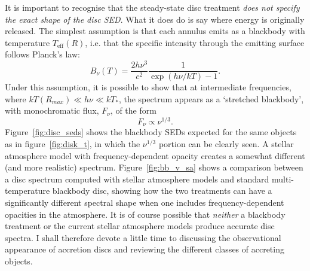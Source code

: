 It is important to recognise that the steady-state disc treatment
{\sl does not specify the exact shape of the disc SED}. What it does do is 
say where energy is originally released. The simplest assumption is
that each annulus emits as a blackbody with temperature 
$T_{\mathrm{eff}} (R)$, i.e. that the specific intensity through the emitting surface
follows Planck's law:
\begin{equation}
B_\nu (T) = \frac{2 h \nu^3}{c^2} \frac{1}{\exp(h\nu / kT) - 1}.
\label{eq:planck}
\end{equation}
Under this assumption, it is possible to show that at intermediate frequencies, 
where $kT(R_{max}) \ll h \nu \ll kT_*$,
the spectrum appears as a `stretched blackbody', with monochromatic flux, 
$F_\nu$, of the form 
\begin{equation}
F_{\nu} \propto \nu^{1/3}.
\end{equation}
Figure~\ref{fig:disc_seds} shows the blackbody SEDs expected for the same 
objects as in figure~\ref{fig:disk_t}, in
which the $\nu^{1/3}$ portion can be clearly seen.
A stellar atmosphere model with frequency-dependent opacity creates a somewhat 
different (and more realistic) spectrum. 
Figure~\ref{fig:bb_v_sa} shows a comparison between a disc spectrum computed with 
stellar atmosphere models and standard multi-temperature blackbody disc, showing how the two treatments
can have a significantly different spectral shape when one includes frequency-dependent opacities
in the atmosphere. It is of course possible that {\em neither} a blackbody treatment
or the current stellar atmosphere models produce accurate disc spectra. 
I shall therefore devote a little time to discussing
the observational appearance of accretion discs and reviewing
the different classes of accreting objects.


